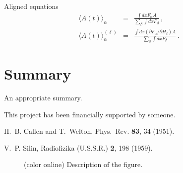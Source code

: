 \documentclass[aip,pop,reprint]{revtex4-1}
\begin{document}
Aligned equations
\begin{eqnarray}
  \langle A(t) \rangle_{\alpha} &=& \frac{\int dx F_{\alpha}
  A}{\sum_{\beta} \int dx F_{\beta}} \,,
  \\
  \langle A(t) \rangle_\alpha^{(\ell)} &=& \frac{\int dx
  (\partial F_\alpha/\partial H_\ell) A}{\sum_{\beta} \int dx F_{\beta}} \,.
  \label{ave_Fal}
\end{eqnarray}


\section{Summary}
\label{sc:summary}
An appropriate summary.





\begin{acknowledgments}
  This project has been financially supported by someone.
\end{acknowledgments}





% 
% 
\begin{thebibliography}{10}

H.~B. Callen and T.~Welton, Phys.~Rev. {\bf 83}, 34 (1951).

V.~P. Silin, Radiofizika (U.S.S.R.) {\bf 2}, 198 (1959).
\end{thebibliography}





\pagebreak

\begin{figure}[h!]
  \centering 
  \caption{(color online) Description of the figure. }
  \label{fig1}
\end{figure}
\end{document}
